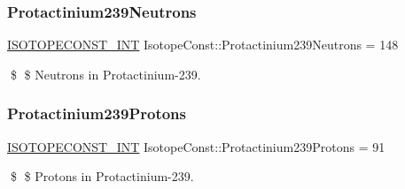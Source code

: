 \subsubsection{\texorpdfstring{Protactinium239\+Neutrons}{Protactinium239Neutrons}}
{\footnotesize\ttfamily \mbox{\hyperlink{group___isotope_const-_macros_ga5f18360b3e99483a35c32d789e62621c}{I\+S\+O\+T\+O\+P\+E\+C\+O\+N\+S\+T\+\_\+\+I\+NT}} Isotope\+Const\+::\+Protactinium239\+Neutrons = 148}

\$ \$ Neutrons in Protactinium-\/239. \mbox{\label{group___isotope_const-_protactinium-_pa239_ga9b6ab8b72e3356ba48321169fd9b76ed}} 
\subsubsection{\texorpdfstring{Protactinium239\+Protons}{Protactinium239Protons}}
{\footnotesize\ttfamily \mbox{\hyperlink{group___isotope_const-_macros_ga5f18360b3e99483a35c32d789e62621c}{I\+S\+O\+T\+O\+P\+E\+C\+O\+N\+S\+T\+\_\+\+I\+NT}} Isotope\+Const\+::\+Protactinium239\+Protons = 91}

\$ \$ Protons in Protactinium-\/239. 